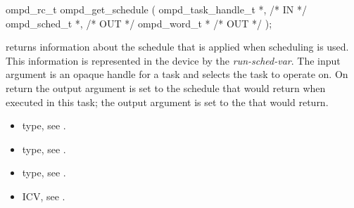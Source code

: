 %	
%	

%
\summary

\format
\cspecificstart
\begin{boxedcode}
ompd\_rc\_t ompd\_get\_schedule (
  ompd\_task\_handle\_t        *,                           /* IN */
  ompd\_sched\_t              *,                                 /* OUT */
  ompd\_word\_t              *                              /* OUT */
); 
\end{boxedcode}
\cspecificend

\descr

 returns information about the schedule that is
applied when  scheduling is used.
%
This information is represented in the device by the
\emph{run-sched-var}.
\argdesc
The input argument  is an opaque handle for a task and selects the task to operate on.
On return the output argument  is set to the schedule that  would return when
executed in this task; the output argument  is set to the  that 
 would return.


\crossreferences
\begin{itemize}
	\item {} type, see .
	\item {} type, see .
	\item {} type, see .
	\item {} ICV, see .
\end{itemize}


